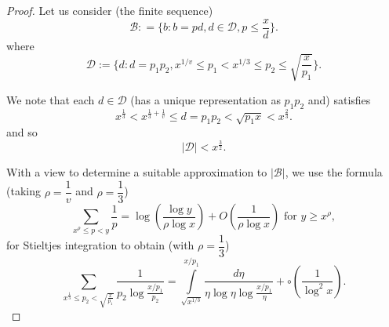 \begin{proof}%
Let us consider (the finite sequence)
\begin{equation*}
\mathscr{B} : = \{ b:b = pd, d \in \mathscr{D}, p \le \frac{x}{d}
\}.\tag{10.18}\label{eq10.18} 
\end{equation*}
where \pageoriginale
\begin{equation*}
\mathscr{D}:=\bigg\{ d:d= p_1 p_2, x^{1/v} \leq p_1 < x^{1/3} \leq p_2
\leq \sqrt{\frac{x}{p_1}} \bigg\}. \tag{10.19}\label{eq10.19}
\end{equation*}

We note that each $d \in \mathscr{D}$ (has a unique representation as
$p_1 p_2$ and) satisfies  
\begin{equation*}
x^{\frac{1}{3}} < x^{\frac{1}{3}+ \frac{1}{v}} \leq d = p_1 p_2 <
\sqrt{p_1 x} < x^{\frac{2}{3}}.\tag{10.20}\label{eq10.20} 
\end{equation*}
and so 
\begin{equation*}
|\mathscr{D}|< x^{\frac{3}{2}}. \tag{10.21}\label{eq10.21}
\end{equation*}

With a view to determine a suitable approximation to $|\mathscr{B}|$, we
use the formula (taking $\rho  = \dfrac{1}{v}$ and $\rho =
\dfrac{1}{3}$) 
\begin{equation*}
\sum_{x^\rho \leq p < y}\frac{1}{p}= \log (\frac{\log y}{\rho \log
  x})+ O (\frac{1}{\rho \log x}) \text{ for } y \geq x^{\rho},
\tag{10.22}\label{eq10.22} 
\end{equation*}
for Stieltjes integration to obtain (with $\rho = \dfrac{1}{3}$)
\begin{equation*}
\sum_{x^{\frac{1}{3}} \leq p_2 < \sqrt{\frac{x}{p_1}}} \frac{1}{p_2
  \log \frac{x/ p_1}{p_2}}= \int\limits^{x/p_1}_{\sqrt{x^{1/3}}}
\frac{d\eta}{\eta \log \eta \log \frac{x/p_1}{\eta}}+ \circ (\frac{1}{\log
  ^2 x}).\tag{10.23}\label{eq10.23} 
\end{equation*}


\end{proof}
